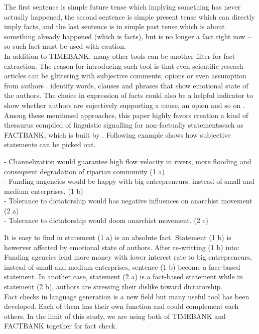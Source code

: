 The first sentence is simple future tense which implying something has never actually happened, the second sentence is simple present tense which can directly imply facts, and the last sentence is in simple past tense which is about something already happened (which is facts), but is no longer a fact right now -- so such fact must be used with caution. \\

In addition to TIMEBANK, many other tools can be another filter for fact extraction. The reason for introducing such tool is that even scientific reseach articles can be glittering with subjective comments, opions or even assumption from authors \cite{schultze2000confessional}. \cite{dave2003mining} identify words, clauses and phrases that show emotional state of the authors. The choice in expression of facts could also be a helpful indicator to show whether authors are sujectively supporting a cause, an opion and so on \cite{wiebe2005annotating}. Among these mentioned approaches, this paper highly favors creation a kind of thesaurus compiled of linguistic signalling for non-factually statementssuch as FACTBANK, which is built by \cite{sauri2009factbank}. Following example shows how subjective statements can be picked out.\\
\noindent
\begin{flushleft}
	-   Channelization would guarantee high flow velocity in rivers, more flooding and consequent degradation of riparian community (1 a)\\
	-	Funding angencies would be happy with big entrepreneurs, instead of small and medium enterprises. (1 b)\\
	-	Tolerance to dictatorship would has negative influences on anarchist movement (2 a)\\
	-	Tolerance to dictatorship would doom anarchist movement. (2 c)\\
\end{flushleft}

It is easy to find in statement (1 a) is an absolute fact. Statement (1 b) is howerver affected by emotional state of authors. After re-writting (1 b) into: Funding agencies lend more money with lower interest rate to big entrepreneurs, instead of small and medium enterprises, sentence (1 b) become a face-based statement. In another case, statement (2 a) is a fact-based statement while in statement (2 b), authors are stressing their dislike toward dictatorship.\\
Fact checks in language generation is a new field but many useful tool has been developed. Each of them has their own function and could complement each others. In the limit of this study, we are using both of TIMEBANK and FACTBANK together for fact check.\\


